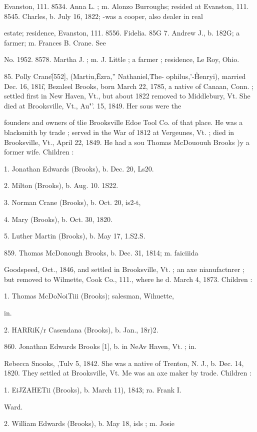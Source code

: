 \documentclass{book}
\begin{document}
Evanston, 111. 
8534. Anna L. ; m. Alonzo Burroughs; resided at Evanston, 111. 
8545. Charles, b. July 16, 1822; -was a cooper, also dealer in real 

estate; residence, Evanston, 111. 
8556. Fidelia. 
85G 7. Andrew J., b. 182G; a farmer; m. Frances B. Crane. See 

No. 1952. 
8578. Martha J. ; m. J. Little ; a farmer ; residence, Le Roy, Ohio. 

85. Polly Crane\^ [552], (Martiu,\^ Ezra,'' Nathaniel,\^ The- 
ophilus,'-\^ Henryi), married Dec. 16, 181i\^, Bezaleel Brooks, born 
March 22, 1785, a native of Canaan, Conn. ; settled first in New 
Haven, Vt., but about 1822 removed to Middlebury, Vt. She 
died at Brooksville, Vt., Au"'. 15, 1849. Her sous were the 




founders and owners of tlie Brooksville Edoe Tool Co. of that 
place. He was a blacksmith by trade ; served in the War of 
1812 at Vergeunes, Vt. ; died in Brooksville, Vt., April 22, 1849. 
He had a sou Thomas McDououuh Brooks )y a former wife. 
Children : 

1. Jonathan Edwards (Brooks), b. Dec. 20, Ls20. 

2. Milton (Brooks), b. Aug. 10. 1S22. 

3. Norman Crane (Brooks), b. Oct. 20, is2-t, 

4. Mary (Brooks), b. Oct. 30, 1820. 

5. Luther Martin (Brooks), b. May 17, 1.S2.S. 

859. Thomas McDonough Brooks, b. Dec. 31, 1814; m. faiciiida 

Goodspeed, Oct., 1846, and settled in Brooksville, Vt. ; an axe 
nianufactnrer ; but removed to Wilmette, Cook Co., 111., 
where he d. March 4, 1873. Children : 

1. Thomas McDoNoiTiii (Brooks); salesman, Wihuette, 

in. 

2. HARRiK/r Casendana (Brooks), b. Jan., 18r)2. 

860. Jonathan Edwards Brooks [1], b. in NeAv Haven, Vt. ; in. 

Rebecca Snooks, ,Tulv 5, 1842. She was a native of Trenton, 
N. J., b. Dec. 14, 1820. They settled at Brooksville, Vt. Me 
was an axe maker by trade. Children : 

1. EiJZAHETii (Brooks), b. March 11), 1843; ra. Frank I. 

Ward. 

2. William Edwards (Brooks), b. May 18, isls ; m. Josie 
\end{document}

